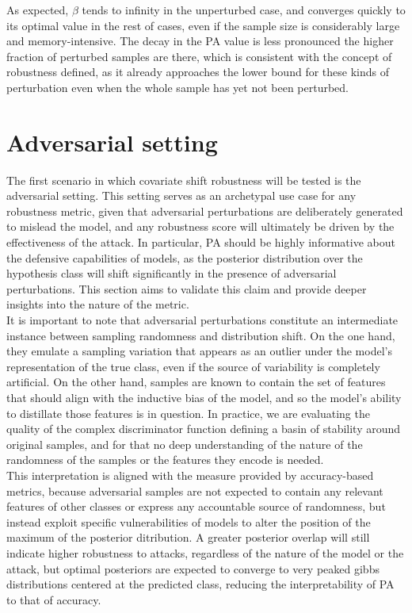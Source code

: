 As expected, $\beta$ tends to infinity in the unperturbed case, and converges
quickly to its optimal value in the rest of cases, even if the sample size is considerably
large and memory-intensive. The decay in the PA value is less pronounced the higher
fraction of perturbed samples are there, which is consistent with the concept 
of robustness defined, as it already approaches
the lower bound for these kinds of perturbation even when the whole sample has yet not
been perturbed. \\

\section{Adversarial setting}\label{sec:results_adversarial}

The first scenario in which covariate shift robustness will be tested is the
adversarial setting. This setting serves as an archetypal use case for any robustness 
metric, given that adversarial perturbations are deliberately generated to mislead the
model, and any robustness score will ultimately be driven by the effectiveness of the 
attack. In particular, PA should be highly informative about the defensive capabilities 
of models, as the posterior distribution over the hypothesis class will shift 
significantly in the presence of adversarial perturbations. This section aims to validate 
this claim and provide deeper insights into the nature of the metric. \\

It is important to note that adversarial perturbations constitute an
intermediate instance between sampling randomness and distribution shift. 
On the one hand, they emulate a sampling variation that appears 
as an outlier under the model's representation of the true class, even if
the source of variability is completely artificial. On the other
hand, samples are known to contain the set of features that should 
align with the inductive bias of the model, and so the model's ability to 
distillate those features is in question. In practice, we are evaluating the 
quality of the complex discriminator function defining a basin of stability
around original samples, and for that no deep understanding of the nature of 
the randomness of the samples or the features they encode is needed.\\

This interpretation is aligned with the measure provided by accuracy-based metrics, 
because adversarial samples are not expected to contain any relevant features of other
classes or express any accountable source of randomness, but instead exploit specific
vulnerabilities of models to alter the position of the maximum of 
the posterior ditribution. A greater posterior overlap will still
indicate higher robustness to attacks, regardless of the nature of the model or the
attack, but optimal posteriors are expected to converge to very peaked gibbs
distributions centered at the predicted class, reducing the interpretability of PA
to that of accuracy. \\

